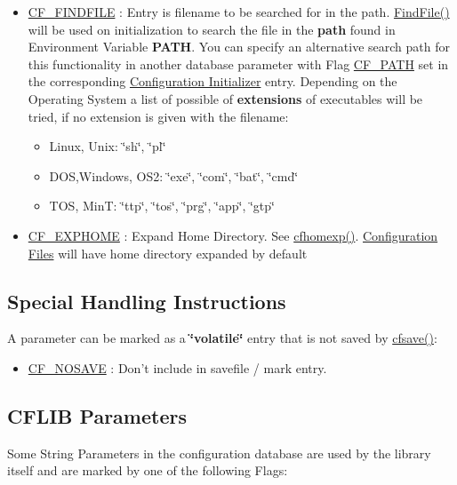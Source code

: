 \begin{itemize}
\item \hyperlink{group__special__options__mask_g675b6f8440beecc09fec54d17e9c3ee9}{CF\_\-FINDFILE} : Entry is filename to be searched for in the path.  \hyperlink{group__utilities_g4e4e8f9a03b7f3598b5efd199b9a67c9}{FindFile()} will be used on initialization to search the file in the {\bf path} found in Environment Variable {\bf PATH}. You can specify an alternative search path for this functionality in another database parameter with Flag \hyperlink{group__special__options__mask_gb383c1436888ea6b410141f7c0b1f306}{CF\_\-PATH} set in the corresponding \hyperlink{config_initializer}{Configuration Initializer} entry. Depending on the Operating System a list of possible of {\bf extensions} of executables will be tried, if no extension is given with the filename:\begin{itemize}
\item Linux, Unix: \char`\"{}sh\char`\"{}, \char`\"{}pl\char`\"{}\item DOS,Windows, OS2: \char`\"{}exe\char`\"{}, \char`\"{}com\char`\"{}, \char`\"{}bat\char`\"{}, \char`\"{}cmd\char`\"{}\item TOS, MinT: \char`\"{}ttp\char`\"{}, \char`\"{}tos\char`\"{}, \char`\"{}prg\char`\"{}, \char`\"{}app\char`\"{}, \char`\"{}gtp\char`\"{}\end{itemize}
\end{itemize}


\begin{itemize}
\item \hyperlink{group__special__options__mask_gff1b2e25aa9a89a55c1784018e24aa75}{CF\_\-EXPHOME} : Expand Home Directory.  See \hyperlink{group__advanced__features_gb6f874ac347d273dc45ad011808fe703}{cfhomexp()}. \hyperlink{config_files}{Configuration Files} will have home directory expanded by default\end{itemize}
\hypertarget{parameter_types_handling_instructions}{}\subsection{Special Handling Instructions}\label{parameter_types_handling_instructions}
A parameter can be marked as a {\bf \char`\"{}volatile\char`\"{}} entry that is not saved by \hyperlink{group__setting__saving_g046d8a68eae35b987eacca04a9a06cca}{cfsave()}:

\begin{itemize}
\item \hyperlink{group__special__options__mask_gd76153c65f68cc0ee5c1a04c8c3e80bf}{CF\_\-NOSAVE} : Don't include in savefile / mark entry. \end{itemize}
\hypertarget{parameter_types_cflib_parameters}{}\subsection{CFLIB Parameters}\label{parameter_types_cflib_parameters}
Some String Parameters in the configuration database are used by the library itself and are marked by one of the following Flags:

